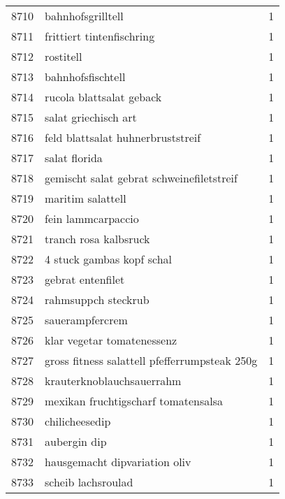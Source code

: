 \begin{tabular}{llr}
8710 &                                  bahnhofsgrilltell &      1 \\
8711 &                          frittiert tintenfischring &      1 \\
8712 &                                          rostitell &      1 \\
8713 &                                  bahnhofsfischtell &      1 \\
8714 &                           rucola blattsalat geback &      1 \\
8715 &                               salat griechisch art &      1 \\
8716 &                  feld blattsalat huhnerbruststreif &      1 \\
8717 &                                      salat florida &      1 \\
8718 &          gemischt salat gebrat schweinefiletstreif &      1 \\
8719 &                                  maritim salattell &      1 \\
8720 &                                 fein lammcarpaccio &      1 \\
8721 &                              tranch rosa kalbsruck &      1 \\
8722 &                          4 stuck gambas kopf schal &      1 \\
8723 &                                  gebrat entenfilet &      1 \\
8724 &                                rahmsuppch steckrub &      1 \\
8725 &                                    sauerampfercrem &      1 \\
8726 &                         klar vegetar tomatenessenz &      1 \\
8727 &      gross fitness salattell pfefferrumpsteak 250g &      1 \\
8728 &                          krauterknoblauchsauerrahm &      1 \\
8729 &                mexikan fruchtigscharf tomatensalsa &      1 \\
8730 &                                     chilicheesedip &      1 \\
8731 &                                       aubergin dip &      1 \\
8732 &                      hausgemacht dipvariation oliv &      1 \\
8733 &                                 scheib lachsroulad &      1 \\

\end{tabular}
